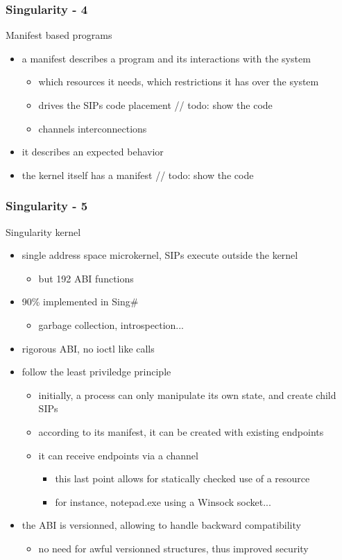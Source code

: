 \begin{frame}
  \frametitle{Singularity - 4}
  Manifest based programs
  \begin{itemize}
    \item a manifest describes a program and its interactions with the system
    \begin{itemize}
      \item which resources it needs, which restrictions it has over the system
      \item drives the SIPs code placement // todo: show the code
      \item channels interconnections
    \end{itemize}
    \item it describes an expected behavior
    \item the kernel itself has a manifest // todo: show the code
  \end{itemize}
\end{frame}


\begin{frame}
  \frametitle{Singularity - 5}
  Singularity kernel
 
 \begin{itemize}
   \item single address space microkernel, SIPs execute outside the kernel
     \begin{itemize} \item but 192 ABI functions \end{itemize}
   \item 90\% implemented in Sing\#
     \begin{itemize} \item garbage collection, introspection... \end{itemize}
   \item rigorous ABI, no ioctl like calls
   \item follow the least priviledge principle
   \begin{itemize}
     \item initially, a process can only manipulate its own state, and create child SIPs
     \item according to its manifest, it can be created with existing endpoints
     \item it can receive endpoints via a channel
     \begin{itemize}
       \item this last point allows for statically checked use of a resource
       \item for instance, notepad.exe using a Winsock socket...
     \end{itemize}
   \end{itemize}
  \item the ABI is versionned, allowing to handle backward compatibility
    \begin{itemize} \item no need for awful versionned structures, thus improved security \end{itemize}
 \end{itemize}
\end{frame}


